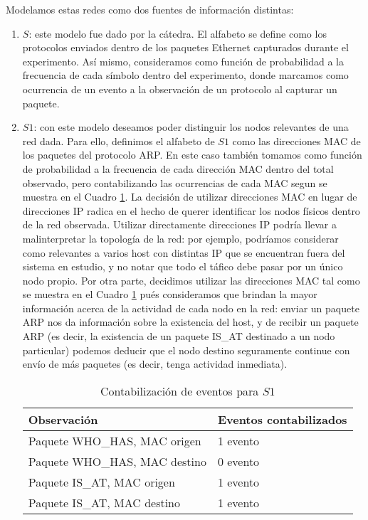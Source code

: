 Modelamos estas redes como dos fuentes de información distintas:
\begin{enumerate}
	\item $S$: este modelo fue dado por la cátedra. El alfabeto se define como los protocolos enviados dentro de los paquetes Ethernet capturados durante el experimento. Así mismo, consideramos como función de probabilidad a la frecuencia de cada símbolo dentro del experimento, donde marcamos como ocurrencia de un evento a la observación de un protocolo al capturar un paquete.
	\item $S1$: con este modelo deseamos poder distinguir los nodos relevantes de una red dada. Para ello, definimos el alfabeto de $S1$ como las direcciones MAC de los paquetes del protocolo ARP. En este caso también tomamos como función de probabilidad a la frecuencia de cada dirección MAC dentro del total observado, pero contabilizando las ocurrencias de cada MAC segun se muestra en el Cuadro \ref{ARP}.
La decisión de utilizar direcciones MAC en lugar de direcciones IP radica en el hecho de querer identificar los nodos físicos dentro de la red observada. Utilizar directamente direcciones IP podría llevar a malinterpretar la topología de la red: por ejemplo, podríamos considerar como relevantes a varios host con distintas IP que se encuentran fuera del sistema en estudio, y no notar que todo el táfico debe pasar por un único nodo propio. Por otra parte, decidimos utilizar las direcciones MAC tal como se muestra en el Cuadro \ref{ARP} pués consideramos que brindan la mayor información acerca de la actividad de cada nodo en la red: enviar un paquete ARP nos da información sobre la existencia del host, y de recibir un paquete ARP (es decir, la existencia de un paquete IS\_AT destinado a un nodo particular) podemos deducir que el nodo destino seguramente continue con envío de más paquetes (es decir, tenga actividad inmediata).

	
		\begin{table}
			\centering
		\begin{tabular}{l l}
				Observación & Eventos contabilizados \\
				\hline
				Paquete WHO\_HAS, MAC origen & 1 evento \\
				Paquete WHO\_HAS, MAC destino & 0 evento \\
				Paquete IS\_AT, MAC origen & 1 evento\\
				Paquete IS\_AT, MAC destino & 1 evento\\
		\end{tabular}
		\caption{Contabilización de eventos para $S1$}
		\label{ARP} 
		\end{table}
\end{enumerate}

